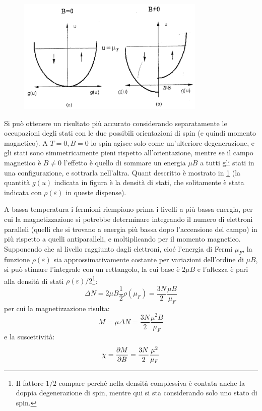 \begin{figure}[t]
\centering
\includegraphics[width=0.8\textwidth]{Immagini/FermiMagnSusc.png}
\vspace{-10pt}
\caption{}
\label{fig:fermimagnsusc}
\vspace{-10pt}
\end{figure}

Si può ottenere un risultato più accurato considerando separatamente le occupazioni degli stati con le due possibili orientazioni di spin (e quindi momento magnetico).
A $ T=0, B=0 $ lo spin agisce solo come un'ulteriore degenerazione, e gli stati sono simmetricamente pieni rispetto all'orientazione, mentre se il campo magnetico è $ B\ne 0 $ l'effetto è quello di sommare un energia $ \mu B $ a tutti gli stati in una configurazione, e sottrarla nell'altra. Quant descritto è mostrato in \cref{fig:fermimagnsusc} (la quantità $ g(u) $ indicata in figura è la densità di stati, che solitamente è stata indicata con $ \rho(\varepsilon) $ in queste dispense).

A bassa temperatura i fermioni riempiono prima i livelli a più bassa energia, per cui la magnetizzazione si potrebbe determinare integrando il numero di elettroni paralleli (quelli che si trovano a energia più bassa dopo l'accensione del campo) in più rispetto a quelli antiparalleli, e moltiplicando per il momento magnetico.
Supponendo che al livello raggiunto dagli elettroni, cioé l'energia di Fermi $ \mu_F $, la funzione $ \rho(\varepsilon) $ sia approssimativamente costante per variazioni dell'ordine di $ \mu B $, si può stimare l'integrale con un rettangolo, la cui base è $ 2 \mu B $ e l'altezza è pari alla densità di stati $ \rho(\varepsilon)/2 $\footnote{Il fattore $ 1/2 $ compare perché nella densità complessiva è contata anche la doppia degenerazione di spin, mentre qui si sta considerando solo uno stato di spin.}:
\[ \Delta N = 2 \mu B \frac{1}{2} \rho(\mu_F) = \frac{3N}{2} \frac{\mu B}{\mu_F}\]
per cui la magnetizzazione risulta:
\[ M = \mu \Delta N = \frac{3N}{2} \frac{\mu^2 B}{\mu_F} \]
e la suscettività:
\[ \chi = \frac{\partial {M}}{\partial {B}} = \frac{3N}{2} \frac{\mu^2}{\mu_F} \]

